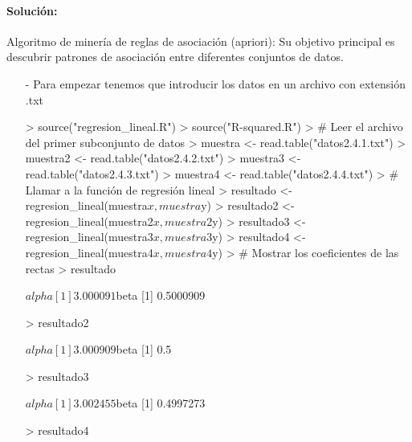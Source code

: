 \documentclass[a4paper, 12pt]{article}
\begin{document}
	\paragraph{Solución:}
			Algoritmo de minería de reglas de asociación (apriori): Su objetivo principal es descubrir patrones de asociación entre diferentes conjuntos de datos.
			\begin{itemize}
				\item[-] Para empezar tenemos que introducir los datos en un archivo con extensión .txt 
\begin{Schunk}
\begin{Sinput}
> source("regresion_lineal.R")
> source("R-squared.R")
> # Leer el archivo del primer subconjunto de datos
> muestra <- read.table("datos2.4.1.txt")
> muestra2 <- read.table("datos2.4.2.txt")
> muestra3 <- read.table("datos2.4.3.txt")
> muestra4 <- read.table("datos2.4.4.txt")
> # Llamar a la función de regresión lineal
> resultado <- regresion_lineal(muestra$x,muestra$y)
> resultado2 <- regresion_lineal(muestra2$x,muestra2$y)
> resultado3 <- regresion_lineal(muestra3$x,muestra3$y)
> resultado4 <- regresion_lineal(muestra4$x,muestra4$y)
> # Mostrar los coeficientes de las rectas
> resultado
\end{Sinput}
\begin{Soutput}
$alpha
[1] 3.000091

$beta
[1] 0.5000909
\end{Soutput}
\begin{Sinput}
> resultado2
\end{Sinput}
\begin{Soutput}
$alpha
[1] 3.000909

$beta
[1] 0.5
\end{Soutput}
\begin{Sinput}
> resultado3
\end{Sinput}
\begin{Soutput}
$alpha
[1] 3.002455

$beta
[1] 0.4997273
\end{Soutput}
\begin{Sinput}
> resultado4
\end{Sinput}
\end{Schunk}
\end{itemize}
\end{document}
